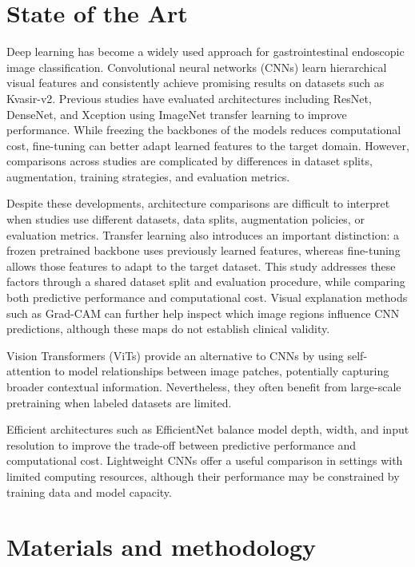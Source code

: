 \documentclass[conference]{IEEEtran}
\begin{document}
\section{State of the Art}
Deep learning has become a widely used approach for gastrointestinal endoscopic image classification. Convolutional neural networks (CNNs) learn hierarchical visual features and consistently achieve promising results on datasets such as Kvasir-v2. Previous studies have evaluated architectures including ResNet, DenseNet, and Xception using ImageNet transfer learning to improve performance. While freezing the backbones of the models reduces computational cost, fine-tuning can better adapt learned features to the target domain. However, comparisons across studies are complicated by differences in dataset splits, augmentation, training strategies, and evaluation metrics.

Despite these developments, architecture comparisons are difficult to interpret when studies use different datasets, data splits, augmentation policies, or evaluation metrics. Transfer learning also introduces an important distinction: a frozen pretrained backbone uses previously learned features, whereas fine-tuning allows those features to adapt to the target dataset. This study addresses these factors through a shared dataset split and evaluation procedure, while comparing both predictive performance and computational cost. Visual explanation methods such as Grad-CAM can further help inspect which image regions influence CNN predictions, although these maps do not establish clinical validity.

Vision Transformers (ViTs) provide an alternative to CNNs by using self-attention to model relationships between image patches, potentially capturing broader contextual information. Nevertheless, they often benefit from large-scale pretraining when labeled datasets are limited.

Efficient architectures such as EfficientNet balance model depth, width, and input resolution to improve the trade-off between predictive performance and computational cost. Lightweight CNNs offer a useful comparison in settings with limited computing resources, although their performance may be constrained by training data and model capacity.

\section{Materials and methodology}
\end{document}
